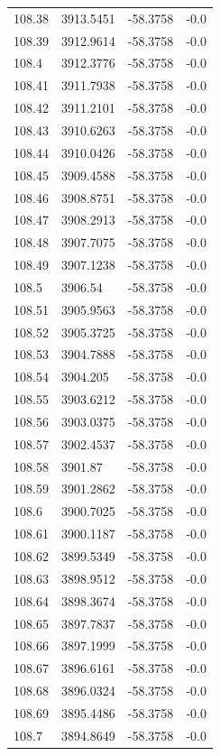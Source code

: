 \begin{table}[H]
\begin{tabular}{llll}
108.38 & 3913.5451 & -58.3758 & -0.0 \\
108.39 & 3912.9614 & -58.3758 & -0.0 \\
108.4 & 3912.3776 & -58.3758 & -0.0 \\
108.41 & 3911.7938 & -58.3758 & -0.0 \\
108.42 & 3911.2101 & -58.3758 & -0.0 \\
108.43 & 3910.6263 & -58.3758 & -0.0 \\
108.44 & 3910.0426 & -58.3758 & -0.0 \\
108.45 & 3909.4588 & -58.3758 & -0.0 \\
108.46 & 3908.8751 & -58.3758 & -0.0 \\
108.47 & 3908.2913 & -58.3758 & -0.0 \\
108.48 & 3907.7075 & -58.3758 & -0.0 \\
108.49 & 3907.1238 & -58.3758 & -0.0 \\
108.5 & 3906.54 & -58.3758 & -0.0 \\
108.51 & 3905.9563 & -58.3758 & -0.0 \\
108.52 & 3905.3725 & -58.3758 & -0.0 \\
108.53 & 3904.7888 & -58.3758 & -0.0 \\
108.54 & 3904.205 & -58.3758 & -0.0 \\
108.55 & 3903.6212 & -58.3758 & -0.0 \\
108.56 & 3903.0375 & -58.3758 & -0.0 \\
108.57 & 3902.4537 & -58.3758 & -0.0 \\
108.58 & 3901.87 & -58.3758 & -0.0 \\
108.59 & 3901.2862 & -58.3758 & -0.0 \\
108.6 & 3900.7025 & -58.3758 & -0.0 \\
108.61 & 3900.1187 & -58.3758 & -0.0 \\
108.62 & 3899.5349 & -58.3758 & -0.0 \\
108.63 & 3898.9512 & -58.3758 & -0.0 \\
108.64 & 3898.3674 & -58.3758 & -0.0 \\
108.65 & 3897.7837 & -58.3758 & -0.0 \\
108.66 & 3897.1999 & -58.3758 & -0.0 \\
108.67 & 3896.6161 & -58.3758 & -0.0 \\
108.68 & 3896.0324 & -58.3758 & -0.0 \\
108.69 & 3895.4486 & -58.3758 & -0.0 \\
108.7 & 3894.8649 & -58.3758 & -0.0 \\

\end{tabular}
\end{table}
